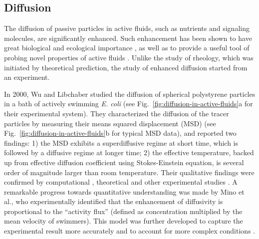 \subsection{Diffusion}
\label{sec:diffusion}
The diffusion of passive particles in active fluids, such as nutrients and signaling molecules, are significantly enhanced. Such enhancement has been shown to have great biological and ecological importance \cite{Wu2000, Kurtuldu2011, Morozov2014}, as well as to provide a useful tool of probing novel properties of active fluids \cite{Squires2010}. Unlike the study of rheology, which was initiated by theoretical prediction, the study of enhanced diffusion started from an experiment.

In 2000, Wu and Libchaber studied the diffusion of spherical polystyrene particles in a bath of actively swimming \textit{E. coli} \cite{Wu2000} (see Fig.~\ref{fig:diffusion-in-active-fluids}a for their experimental system). They characterized the diffusion of the tracer particles by measuring their means squared displacement (MSD) (see Fig.~\ref{fig:diffusion-in-active-fluids}b for typical MSD data), and reported two findings: 1) the MSD exhibits a superdiffusive regime at short time, which is followed by a diffusive regime at longer time; 2) the effective temperature, backed up from effective diffusion coefficient using Stokes-Einstein equation, is several order of magnitude larger than room temperature. Their qualitative findings were confirmed by computational \cite{Underhill2008, Lin2011}, theoretical \cite{Golestanian2009} and other experimental studies
\cite{Chen2007, Leptos2009, Mino2011, Kurtuldu2011, Patteson2016}. A remarkable progress towards quantitative understanding was made by Mino et al., who experimentally identified that the enhancement of diffusivity is proportional to the ``activity flux'' (defined as concentration multiplied by the mean velocity of swimmers). This model was further developed to capture the experimental result more accurately and to account for more complex conditions \cite{Mino2013, Kasyap2014, Morozov2014}.

